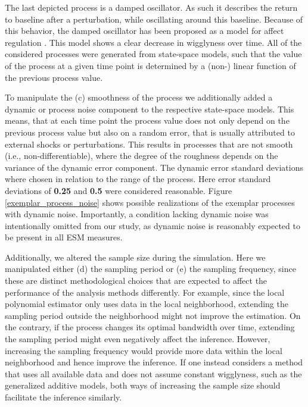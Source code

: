 The last depicted process is a damped oscillator. As such it describes the
return to baseline after a perturbation, while oscillating around this
baseline. Because of this behavior, the damped oscillator has been proposed as
a model for affect regulation \parencite{chow_emotion_2005, waugh_affect_2021}.
This model shows a clear decrease in wigglyness over time.
All of the considered processes were generated from state-space models,
such that the value of the process at a given time point is determined by a
(non-) linear function of the previous process value.

To manipulate the (c) smoothness of the process we additionally added a dynamic
or process noise component to the respective state-space models. This means,
that at each time point the process value does not only depend on the previous
process value but also on a random error, that is usually attributed to
external shocks or perturbations. This results in processes that are not smooth
(i.e., non-differentiable), where the degree of the roughness depends on the
variance of the dynamic error component. The dynamic error standard deviations
where chosen in relation to the range of the process. Here error standard
deviations of \textbf{0.25} and \textbf{0.5} were considered reasonable.
Figure \ref{exemplar_process_noise} shows possible realizations of
the exemplar processes with dynamic noise. Importantly, a condition lacking
dynamic noise was intentionally omitted from our study, as dynamic
noise is reasonably expected to be present in all ESM measures.

\begin{figure*}
    \caption{Non-linear exemplar processes}
    \label{exemplar_process_noise}
\end{figure*}

Additionally, we altered the sample size during the simulation. Here
we manipulated either (d) the sampling period or (e) the sampling frequency,
since these are distinct methodological choices that are expected to affect
the performance of the analysis methods differently. For example, since the
local polynomial estimator \parencite{fan_local_1997} only uses data in the
local neighborhood,
extending the sampling period outside the neighborhood might not improve the
estimation. On the contrary, if the process changes its optimal bandwidth over
time, extending the sampling period might even negatively affect the inference.
However, increasing the sampling frequency would provide more data within the
local neighborhood and hence improve the inference. If one instead considers
a method that uses all available data and does not assume constant
wigglyness, such as the generalized additive models, both ways of increasing
the sample size should facilitate the inference similarly.

